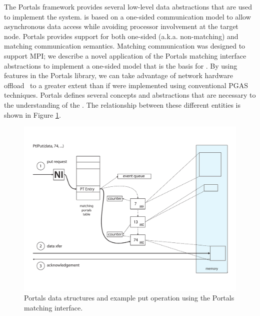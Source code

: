 

The Portals framework provides several low-level data abstractions that
are used to implement the \pdht system. \pdht is based on a one-sided
communication model to allow asynchronous data access while avoiding processor
involvement at the target node.  Portals provides support for both
one-sided (a.k.a. non-matching) and matching communication semantics.
Matching communication was designed to support MPI; we describe
a novel application of the Portals matching interface
abstractions to implement a one-sided model that is the basis for
\pdht. By using features in the Portals library,
we can take advantage of network hardware offload~\cite{brightwell:micro:06,bxi} to a greater extent
than if \pdht were implemented using conventional PGAS techniques. Portals defines several concepts
and abstractions that are necessary to the understanding of the
\pdht. The relationship between these different entities is shown in
Figure \ref{fig:portals_put}.

\begin{figure}[ht]
  \centering
  \includegraphics[width=\linewidth]{figs/portals_put}
  \caption{Portals data structures and example put operation using the Portals matching interface.}
  \label{fig:portals_put}
\end{figure}

